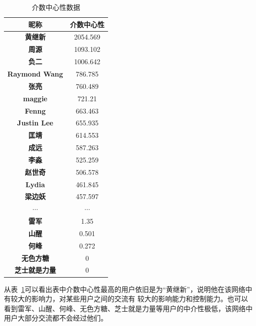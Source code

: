 \documentclass[a4paper]{article}
\begin{document}
\begin{spacing}{1.5}
\begin{table}[htbp]
  \centering
  \caption{介数中心性数据}
    \begin{tabular}{cc}
    \toprule
     \textbf{昵称} & 介数中心性 \\
    \midrule
    \textbf{黄继新} & 2054.569 \\
    \textbf{周源} & 1093.102 \\
    \textbf{负二} & 1006.642 \\
    \textbf{Raymond Wang} & 786.785 \\
    \textbf{张亮} & 760.489 \\
    \textbf{maggie} & 721.21 \\
    \textbf{Fenng} & 663.463 \\
    \textbf{Justin Lee} & 655.935 \\
    \textbf{匡靖} & 614.553 \\
    \textbf{成远} & 587.263 \\
    \textbf{李淼} & 525.259 \\
    \textbf{赵世奇} & 506.578 \\
    \textbf{Lydia} & 461.845 \\
    \textbf{梁边妖} & 457.597 \\
     $\cdots$ & $\cdots$    \\
    \textbf{雷军} & 1.35 \\
    \textbf{山醒} & 0.501 \\
    \textbf{何峰} & 0.272 \\
    \textbf{无色方糖} & 0 \\
    \textbf{芝士就是力量} & 0 \\
    \bottomrule
    \end{tabular}%
  \label{tab2}%
\end{table}%

从表~\ref{tab2}可以看出表中介数中心性最高的用户依旧是为“黄继新”，说明他在该网络中有较大的影响力，对某些用户之间的交流有
较大的影响能力和控制能力。也可以看到雷军、山醒、何峰、无色方糖、芝士就是力量等用户的中介性极低，该网络中用户大部分交流都不会经过他们。


\end{spacing}
\end{document}
